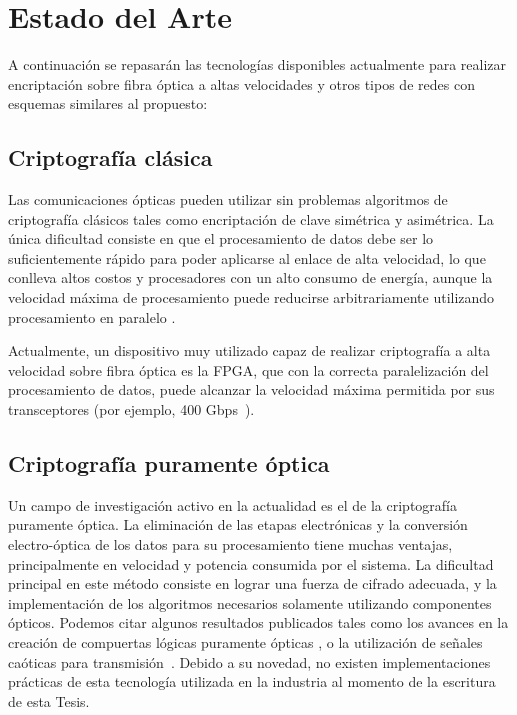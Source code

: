 \section{Estado del Arte}

A continuación se repasarán las tecnologías disponibles actualmente para realizar encriptación sobre fibra óptica a altas velocidades y otros tipos de redes con esquemas similares al propuesto:

\subsection{Criptografía clásica}
Las comunicaciones ópticas pueden utilizar sin problemas algoritmos de criptografía clásicos tales como encriptación de clave simétrica y asimétrica. La única dificultad consiste en que el procesamiento de datos debe ser lo suficientemente rápido para poder aplicarse al enlace de alta velocidad, lo que conlleva altos costos y procesadores con un alto consumo de energía, aunque la velocidad máxima de procesamiento puede reducirse arbitrariamente utilizando procesamiento en paralelo \cite{liforward}.

Actualmente, un dispositivo muy utilizado capaz de realizar criptografía a alta velocidad sobre fibra óptica es la FPGA, que con la correcta paralelización del procesamiento de datos, puede alcanzar la velocidad máxima permitida por sus transceptores (por ejemplo, 400 Gbps~\cite{Algotronix}).

\subsection{Criptografía puramente óptica}
\label{optocry}
Un campo de investigación activo en la actualidad es el de la criptografía puramente óptica. La eliminación de las etapas electrónicas y la conversión electro-óptica de los datos para su procesamiento tiene muchas ventajas, principalmente en velocidad y potencia consumida por el sistema.
La dificultad principal en este método consiste en lograr una fuerza de cifrado adecuada, y la implementación de los algoritmos necesarios solamente utilizando componentes ópticos. Podemos citar algunos resultados publicados tales como los avances en la creación de compuertas lógicas puramente ópticas \cite{jung2008demonstration}, o la utilización de señales caóticas para transmisión~\cite{liu2002synchronized}.
Debido a su novedad, no existen implementaciones prácticas de esta tecnología utilizada en la industria al momento de la escritura de esta Tesis.

